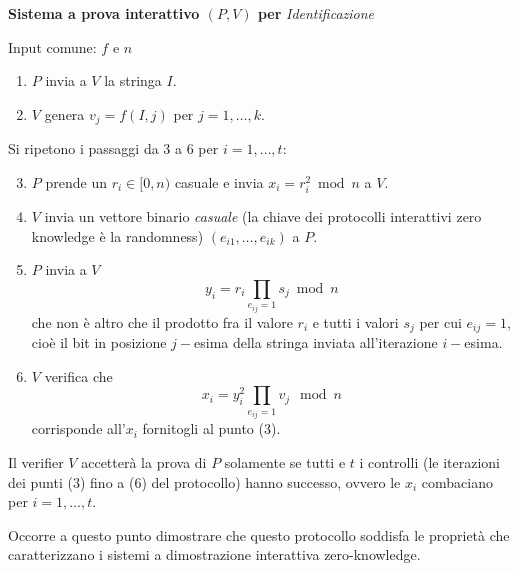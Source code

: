 \documentclass{article}
\theoremstyle{definition}
\begin{document}
\begin{mdframed}
\begin{center}
    \vspace{10pt}
    \textbf{Sistema a prova interattivo $(P, V)$ per} \textit{Identificazione}
    \vspace{10pt}
\end{center} 
Input comune: $f$ e $n$
\begin{enumerate}
    \item $P$ invia a $V$ la stringa $I$. 
    \item $V$ genera $v_j = f(I, j)$ per $j = 1, \dots, k$.  
\end{enumerate}
Si ripetono i passaggi da 3 a 6 per $i = 1, \dots, t$:
\begin{enumerate}
    \setcounter{enumi}{2}
    \item $P$ prende un $r_i \in [0, n)$ casuale e invia $x_i = r_i^2 \bmod n$ a $V$.
    \item $V$ invia un vettore binario \emph{casuale} (la chiave dei protocolli interattivi zero knowledge è la randomness) $(e_{i1}, \dots, e_{ik})$ a $P$.
    \item $P$ invia a $V$ 
    \begin{equation}\label{eq:fiat_shamir_yi}
        y_i = r_i \prod_{e_{ij}=1} s_j \bmod n
    \end{equation}
    che non è altro che il prodotto fra il valore $r_i$ e tutti i valori $s_j$ per cui $e_{ij} = 1$, cioè il bit in posizione $j-$esima della stringa inviata all'iterazione $i-$esima.
    \item $V$ verifica che 
    \begin{equation}\label{eq:fiat_shamir_verifica}
        x_i = y_i^2 \prod_{e_{ij} = 1} v_j \mod n
    \end{equation}
    corrisponde all'$x_i$ fornitogli al punto (3).
\end{enumerate}
\end{mdframed}

Il verifier $V$ accetterà la prova di $P$ solamente se tutti e $t$ i controlli (le iterazioni dei punti (3) fino a (6) del protocollo) hanno successo, ovvero le $x_i$ combaciano per $i = 1, \dots, t$.

Occorre a questo punto dimostrare che questo protocollo soddisfa le proprietà che caratterizzano i sistemi a dimostrazione interattiva zero-knowledge.
\end{document}
